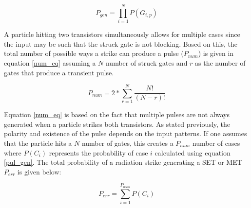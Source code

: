 \begin{equation} \label{pul_gen}
P_{gen} = \prod_{i=1}^{N} P(G_{i, p})
\end{equation}

A particle hitting two transistors simultaneously allows for multiple cases since the input may be such that the struck gate is not blocking. Based on this, the total number of possible ways a strike can produce a pulse ($P_{num}$) is given in equation \ref{num_eq} assuming a $N$ number of struck gates and $r$ as the number of gates that produce a transient pulse.

\begin{equation} \label{num_eq}
P_{num} = 2*\sum_{r=1}^{N} \frac{N!}{(N-r)!}
\end{equation}

Equation \ref{num_eq} is based on the fact that multiple pulses are not always generated when a particle strikes both transistors. As stated previously, the polarity and existence of the pulse depends on the input patterns. If one assumes that the particle hits a $N$ number of gates, this creates a $P_{num}$ number of cases where $P(C_i)$ represents the probability of case $i$ calculated using equation \ref{pul_gen}. The total probability of a radiation strike generating a SET or MET $P_{err}$ is given below:

\begin{equation} \label{err_eq}
P_{err} = \sum_{i=1}^{P_{num}} P(C_i)
\end{equation}


